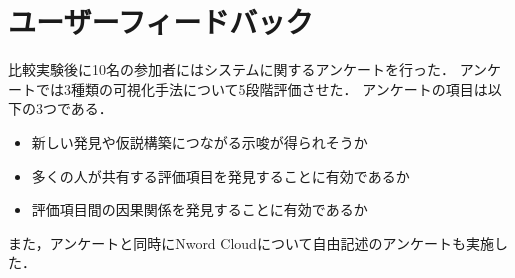 \documentclass[syuuron]{kuee}
\begin{document}
	\section{ユーザーフィードバック}
		比較実験後に10名の参加者にはシステムに関するアンケートを行った．
		アンケートでは3種類の可視化手法について5段階評価させた．
		アンケートの項目は以下の3つである．
		
		\begin{itemize}
			\item 新しい発見や仮説構築につながる示唆が得られそうか
			\item 多くの人が共有する評価項目を発見することに有効であるか
			\item 評価項目間の因果関係を発見することに有効であるか
		\end{itemize}
		また，アンケートと同時にNword Cloudについて自由記述のアンケートも実施した．
		
\end{document}
